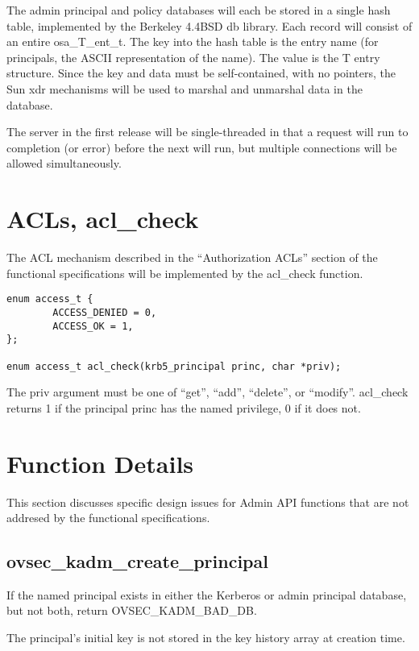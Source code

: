 The admin principal and policy databases will each be stored in a
single hash table, implemented by the Berkeley 4.4BSD db library.
Each record will consist of an entire osa_T_ent_t.  The key into the
hash table is the entry name (for principals, the ASCII representation
of the name).  The value is the T entry structure.  Since the key and
data must be self-contained, with no pointers, the Sun xdr mechanisms
will be used to marshal and unmarshal data in the database.

The server in the first release will be single-threaded in that a
request will run to completion (or error) before the next will run,
but multiple connections will be allowed simultaneously.

\section{ACLs, acl_check}

The ACL mechanism described in the ``Authorization ACLs'' section of
the functional specifications will be implemented by the acl_check
function.

\begin{verbatim}
enum access_t {
        ACCESS_DENIED = 0,
        ACCESS_OK = 1,
};

enum access_t acl_check(krb5_principal princ, char *priv);
\end{verbatim}

The priv argument must be one of ``get'', ``add'', ``delete'', or
``modify''.  acl_check returns 1 if the principal princ has the named
privilege, 0 if it does not.

\section{Function Details}

This section discusses specific design issues for Admin API functions
that are not addresed by the functional specifications.

\subsection{ovsec_kadm_create_principal}

If the named principal exists in either the Kerberos or admin
principal database, but not both, return OVSEC_KADM_BAD_DB.

The principal's initial key is not stored in the key history array at
creation time.


